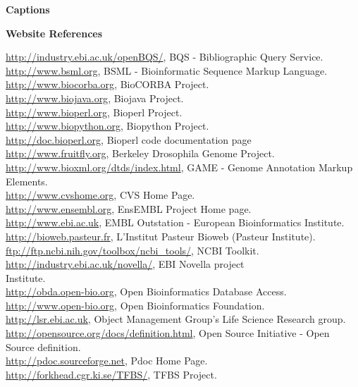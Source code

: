\documentclass[12pt]{article}
\begin{document}
\newpage

\begin{center}{\large \textbf{Captions}}\end{center}

\begin{center}{\large \textbf{Website References}}\end{center}
\par \noindent
\url{http://industry.ebi.ac.uk/openBQS/}, BQS - Bibliographic Query Service.\\
\url{http://www.bsml.org}, BSML - Bioinformatic Sequence Markup Language. \\
\url{http://www.biocorba.org}, BioCORBA Project. \\
\url{http://www.biojava.org}, Biojava Project. \\
\url{http://www.bioperl.org}, Bioperl Project. \\
\url{http://www.biopython.org}, Biopython Project. \\
\url{http://doc.bioperl.org}, Bioperl code documentation page \\
\url{http://www.fruitfly.org}, Berkeley Drosophila Genome Project.\\
\url{http://www.bioxml.org/dtds/index.html},  GAME - Genome
Annotation Markup Elements. \\ 
\url{http://www.cvshome.org}, CVS Home Page. \\
\url{http://www.ensembl.org}, EnsEMBL Project Home page. \\
\url{http://www.ebi.ac.uk}, EMBL Outstation - European Bioinformatics
Institute. \\ 
\url{http://bioweb.pasteur.fr}, L'Institut Pasteur Bioweb (Pasteur Institute). \\
\url{ftp://ftp.ncbi.nih.gov/toolbox/ncbi_tools/}, NCBI Toolkit. \\
\url{http://industry.ebi.ac.uk/novella/}, EBI Novella project \\
Institute. \\ 
\url{http://obda.open-bio.org}, Open Bioinformatics Database Access. \\
\url{http://www.open-bio.org}, Open Bioinformatics Foundation. \\
\url{http://lsr.ebi.ac.uk}, Object Management Group's Life Science Research group. \\
\url{http://opensource.org/docs/definition.html}, Open Source
Initiative - Open Source definition. \\
\url{http://pdoc.sourceforge.net}, Pdoc Home Page. \\
\url{http://forkhead.cgr.ki.se/TFBS/}, TFBS Project. \\
\end{document}
